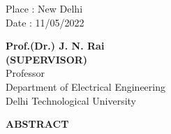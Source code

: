 \documentclass[12pt,a4paper]{report}
\begin{document}
\noindent \begin{minipage}{4cm}
\begin{flushleft}
\vspace{1 cm}
                         
Place : New Delhi \\
Date : 11/05/2022 \\

\end{flushleft} 
\end{minipage}
\hfill
\begin{minipage}{10cm}
\begin{flushright}                                      
\vspace{2cm}
                         

\vspace{.8cm}
\textbf{Prof.(Dr.) J. N. Rai}\\
\textbf{(SUPERVISOR)}\\
Professor\\
Department of Electrical Engineering \\
Delhi Technological University\\
\end{flushright} 
\end{minipage}

\newpage


\begin{center}
 \textbf{ABSTRACT}
\end{center}
\end{document}
